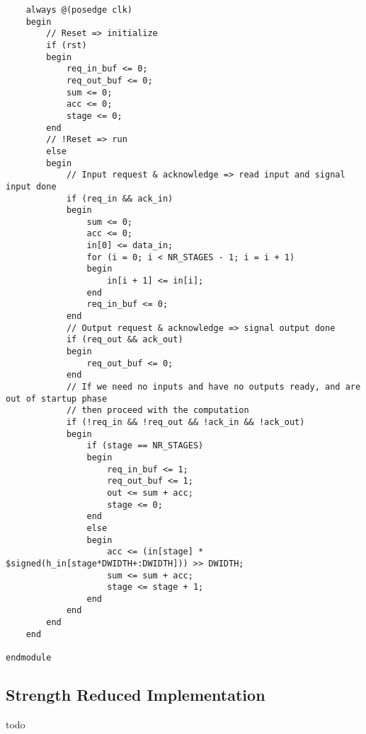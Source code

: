\begin{verbatim}
    always @(posedge clk)
    begin
        // Reset => initialize
        if (rst)
        begin
            req_in_buf <= 0;
            req_out_buf <= 0;
            sum <= 0;
            acc <= 0;
            stage <= 0;
        end
        // !Reset => run
        else
        begin
            // Input request & acknowledge => read input and signal input done
            if (req_in && ack_in)
            begin
                sum <= 0;
                acc <= 0;
                in[0] <= data_in;
                for (i = 0; i < NR_STAGES - 1; i = i + 1)
                begin
                    in[i + 1] <= in[i];
                end
                req_in_buf <= 0;
            end
            // Output request & acknowledge => signal output done
            if (req_out && ack_out)
            begin
                req_out_buf <= 0;
            end
            // If we need no inputs and have no outputs ready, and are out of startup phase
            // then proceed with the computation
            if (!req_in && !req_out && !ack_in && !ack_out)
            begin   
                if (stage == NR_STAGES)
                begin
                    req_in_buf <= 1;
                    req_out_buf <= 1;
                    out <= sum + acc;
                    stage <= 0;
                end
                else
                begin
                    acc <= (in[stage] * $signed(h_in[stage*DWIDTH+:DWIDTH])) >> DWIDTH;
                    sum <= sum + acc;
                    stage <= stage + 1;
                end
            end
        end
    end

endmodule

\end{verbatim}
\subsection{Strength Reduced Implementation}
\label{sec:source2}
todo
